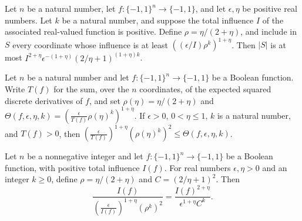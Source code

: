 \begin{theorem}
\label{FABL.card_improvedFriedgutCoordinates_le_general}
\leanok
{}
Let $n$ be a natural number, let $f:\{-1,1\}^n\to\{-1,1\}$, and let
$\epsilon,\eta$ be positive real numbers. Let $k$ be a natural number, and suppose the
total influence $I$ of the associated real-valued function is positive. Define
$\rho=\eta/(2+\eta)$, and include in $S$ every coordinate whose influence is at least
$\left((\epsilon/I)\rho^k\right)^{1+\eta}$. Then $|S|$ is at most
$I^{2+\eta}\epsilon^{-(1+\eta)}(2/\eta+1)^{(1+\eta)k}$.
\end{theorem}

\begin{theorem}
\label{FABL.improvedFriedgutThreshold_lower}
\leanok
{}
Let $n$ be a natural number and let $f:\{-1,1\}^n\to\{-1,1\}$ be a Boolean function.
Write $T(f)$ for the sum, over the $n$ coordinates, of the expected squared discrete
derivatives of $f$, and set $\rho(\eta)=\eta/(2+\eta)$ and
$\Theta(f,\epsilon,\eta,k)=(\frac{\epsilon}{T(f)}\rho(\eta)^k)^{1+\eta}$. If
$\epsilon>0$, $0<\eta\le1$, $k$ is a natural number, and $T(f)>0$, then
$\left(\frac{\epsilon}{T(f)}\right)^{1+\eta}(\rho(\eta)^k)^2\le\Theta(f,\epsilon,\eta,k)$.
\end{theorem}

\begin{theorem}
\label{FABL.improvedFriedgut_bookDenominator_identity}
\leanok
{}
Let $n$ be a nonnegative integer and let $f:\{-1,1\}^n\to\{-1,1\}$ be a Boolean
function, with positive total influence $I(f)$. For real numbers $\epsilon,\eta>0$ and
an integer $k\ge0$, define $\rho=\eta/(2+\eta)$ and $C=(2/\eta+1)^2$. Then
$$\frac{I(f)}{\left(\frac{\epsilon}{I(f)}\right)^{1+\eta}(\rho^k)^2}=\frac{I(f)^{2+\eta}}{\epsilon^{1+\eta}C^k}.$$
\end{theorem}

